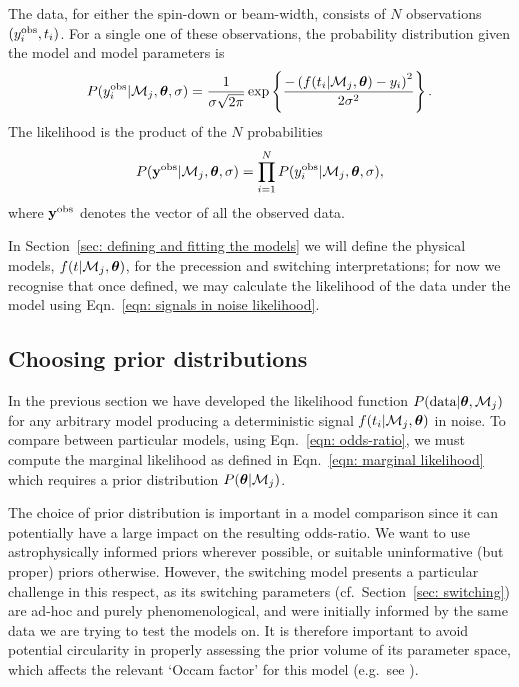 \documentclass[../full_thesis/full_thesis.tex]{subfiles}
\begin{document}
The data, for either the spin-down or beam-width, consists of $N$ observations
$(y^{\textrm{obs}}_{i}, t_{i})$. For a
single one of these observations,
the probability distribution given the model and model parameters is
\begin{align}
P(y_{i}^{\textrm{obs}}| \mathcal{M}_j, \boldsymbol{\theta}, \sigma) =
\frac{1}{\sigma\sqrt{2\pi}}
\exp\left\{\frac{-\left(f(t_{i}|\mathcal{M}_j, \boldsymbol{\theta})
            - y_{i}\right)^{2}}{2\sigma^{2}}\right\}.
\end{align}
The likelihood is the product of the $N$ probabilities
\begin{equation}
P(\mathbf{y}^{\mathrm{obs}}| \mathcal{M}_{j}, \boldsymbol{\theta}, \sigma) =
              \prod_{i=1}^{N} P(y_{i}^{\textrm{obs}}|\mathcal{M}_{j}, \boldsymbol{\theta}, \sigma),
\label{eqn: signals in noise likelihood}
\end{equation}
where $\mathbf{y}^{\mathrm{obs}}$ denotes the vector of all the observed data.

In Section~\ref{sec: defining and fitting the models} we will define the physical
models, $f(t| \mathcal{M}_j, \boldsymbol{\theta})$, for the precession and
switching interpretations; for now we recognise that once defined, we may
calculate the likelihood of the data under the model using Eqn.~\eqref{eqn:
signals in noise likelihood}.

\subsection{Choosing prior distributions}
\label{sec: setting prior distributions}

In the previous section we have developed the likelihood function $P(\textrm{data}|
\boldsymbol{\theta}, \mathcal{M}_{j})$ for any arbitrary model producing a deterministic signal
$f(t_{i}|\mathcal{M}_j, \boldsymbol{\theta})$ in noise. To compare between particular models, using
Eqn.~\eqref{eqn: odds-ratio}, we must compute the marginal likelihood as
defined in Eqn.~\eqref{eqn: marginal likelihood} which requires a prior
distribution $P(\boldsymbol{\theta}|\mathcal{M}_{j})$.

The choice of prior distribution is important in a model comparison since it
can potentially have a large impact on the resulting odds-ratio. We
want to use astrophysically informed priors wherever possible, or suitable
uninformative (but proper) priors otherwise. However, the switching model
presents a particular challenge in this respect, as its switching parameters
(cf.\ Section~\ref{sec: switching}) are ad-hoc and purely phenomenological, and
were initially informed by the same data we are trying to test the models on.
It is therefore important to avoid potential circularity in properly assessing
the prior volume of its parameter space, which affects the relevant `Occam
factor' for this model (e.g.\ see \citet{mackay2003information}).
\end{document}
